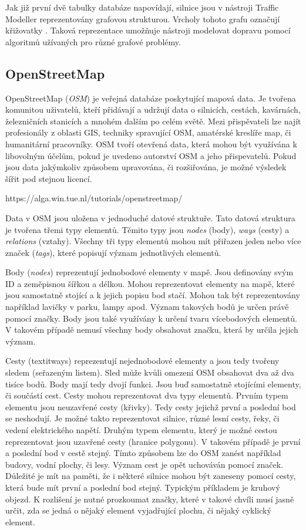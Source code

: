 Jak již první dvě tabulky databáze napovídají, silnice jsou v nástroji Traffic Modeller reprezentovány grafovou strukturou. Vrcholy tohoto grafu označují křižovatky . Taková reprezentace umožňuje nástroji modelovat dopravu pomocí algoritmů užívaných pro různé grafové problémy. 


\subsection{OpenStreetMap}

OpenStreetMap (\textit{OSM}) je veřejná databáze poskytující mapová data. Je tvořena komunitou uživatelů, kteří přidávají a udržují data o silnicích, cestách, kavárnách, železničních stanicích a mnohém dalším po celém světě. Mezi přispěvateli lze najít profesionály z oblasti GIS, techniky spravující OSM, amatérské kreslíře map, či humanitární pracovníky. OSM tvoří otevřená data, která mohou být využívána k libovolným účelům, pokud je uvedeno autorství OSM a jeho přispevatelů. Pokud jsou data jakýmkoliv způsobem upravována, či rozšiřována, je možné výsledek šířit pod stejnou licencí. 

https://alga.win.tue.nl/tutorials/openstreetmap/

Data v OSM jsou uložena v jednoduché datové struktuře. Tato datová struktura je tvořena třemi typy elementů. Těmito typy jsou \textit{nodes} (body), \textit{ways} (cesty) a \textit{relations} (vztahy). Všechny tři typy elementů mohou mít přiřazen jeden nebo více značek (\textit{tags}), které popisují význam jednotlivých elementů. 

Body (\textit{nodes}) reprezentují jednobodové elementy v mapě. Jsou definovány svým ID a zeměpisnou šířkou a délkou. Mohou reprezentovat elementy na mapě, které jsou samostatně stojící a k jejich popisu bod stačí. Mohou tak být reprezentovány například lavičky v parku, lampy apod. Význam takových bodů je určen právě pomocí značky. Body jsou také využívány k určení tvaru vícebodových elementů. V takovém případě nemusí všechny body obsahovat značku, která by určila jejich význam.

Cesty (textit{ways}) reprezentují nejednobodové elementy a jsou tedy tvořeny sledem (seřazeným listem). Sled může kvůli omezení OSM obsahovat dva až dva tisíce bodů. Body mají tedy dvojí funkci. Jsou buď samostatně stojícími elementy, či součástí cest. Cesty mohou reprezentovat dva typy elementů. Prvním typem elementu jsou neuzavřené cesty (křivky). Tedy cesty jejichž první a poslední bod se neshodují. Je možné takto reprezentovat silnice, různé lesní cesty, řeky, či vedení elektrického napětí. Druhým typem elementu, který je možné cestou reprezentovat jsou uzavřené cesty (hranice polygonu). V takovém případě je první a poslední bod v cestě stejný. Tímto způsobem lze do OSM zanést například budovy, vodní plochy, či lesy. Význam cest je opět uchováván pomocí značek. Důležité je mít na paměti, že i některé silnice mohou být zaneseny pomocí cesty, která bude mít první a poslední bod stejný. Typickým příkladem je kruhový objezd. K rozlišení je nutné prozkoumat značky, které v takové chvíli musí jasně určit, zda se jedná o nějaký element vyjadřující plochu, či nějaký cyklický element.

